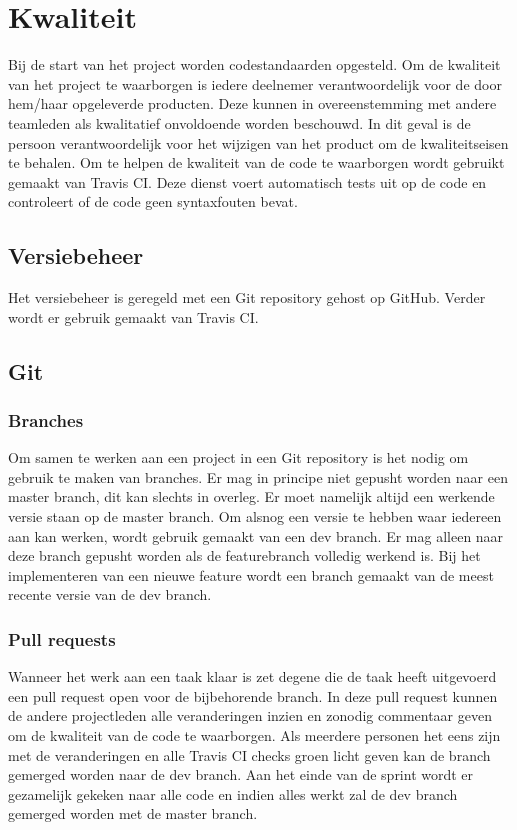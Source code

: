 \section{Kwaliteit}
Bij de start van het project worden codestandaarden opgesteld. Om de kwaliteit
van het project te waarborgen is iedere deelnemer verantwoordelijk voor de door
hem/haar opgeleverde producten. Deze kunnen in overeenstemming met andere
teamleden als kwalitatief onvoldoende worden beschouwd. In dit geval is de
persoon verantwoordelijk voor het wijzigen van het product om de
kwaliteitseisen te behalen. Om te helpen de kwaliteit van de code te waarborgen
wordt gebruikt gemaakt van Travis CI. Deze dienst voert automatisch tests uit
op de code en controleert of de code geen syntaxfouten bevat.

\subsection{Versiebeheer}
\label{sec:versiebeheer}

Het versiebeheer is geregeld met een Git repository gehost op GitHub.
Verder wordt er gebruik gemaakt van Travis CI.

\subsection{Git}
\subsubsection{Branches}
Om samen te werken aan een project in een Git repository is het nodig om
gebruik te maken van branches. Er mag in principe niet gepusht worden
naar een master branch, dit kan slechts in overleg. Er moet namelijk altijd een
werkende versie staan op de master branch. Om alsnog een versie te hebben
waar iedereen aan kan werken, wordt gebruik gemaakt van een dev branch.
Er mag alleen naar deze branch gepusht worden als de featurebranch volledig
werkend is. Bij het implementeren van een nieuwe feature wordt een branch gemaakt
van de meest recente versie van de dev branch.

\subsubsection{Pull requests}
Wanneer het werk aan een taak klaar is zet degene die de taak heeft uitgevoerd
een pull request open voor de bijbehorende branch. In deze pull request kunnen
de andere projectleden alle veranderingen inzien en zonodig commentaar geven om
de kwaliteit van de code te waarborgen. Als meerdere personen het eens zijn
met de veranderingen en alle Travis CI checks groen licht geven kan de branch
gemerged worden naar de dev branch.
Aan het einde van de sprint wordt er gezamelijk gekeken naar alle code en indien
alles werkt zal de dev branch gemerged worden met de master branch.

